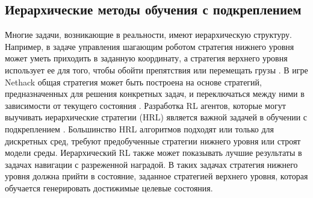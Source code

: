 

\subsection{Иерархические методы обучения с подкреплением}

Многие задачи, возникающие в реальности, имеют иерархическую структуру. Например, в задаче управления шагающим роботом стратегия нижнего уровня может уметь приходить в заданную координату, а стратегия верхнего уровня использует ее для того, чтобы обойти препятствия или перемещать грузы \cite{robel}. В игре Nethack общая стратегия может быть построена на основе стратегий, предназначенных для решения конкретных задач, и переключаться между ними в зависимости от текущего состояния \cite{confbib3}. Разработка RL агентов, которые могут выучивать иерархические стратегии (HRL) является важной задачей в обучении с подкреплением \cite{Sutton1999, dietterich2000hierarchical, mcGovern}. Большинство HRL алгоритмов подходят или только для дискретных сред, требуют предобученные стратегии нижнего уровня или строят модели среды. Иерархический RL также может показывать лучшие результаты в задачах навигации с разреженной наградой. В таких задачах стратегия нижнего уровня должна прийти в состояние, заданное стратегией верхнего уровня, которая обучается генерировать достижимые целевые состояния. 

